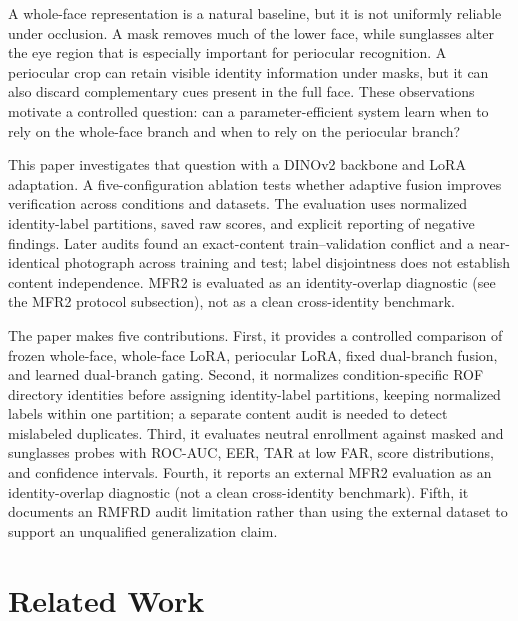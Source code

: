 \documentclass[10pt,journal,compsoc]{IEEEtran}
\begin{document}
A whole-face representation is a natural baseline, but it is not uniformly reliable under occlusion. A mask removes much of the lower face, while sunglasses alter the eye region that is especially important for periocular recognition. A periocular crop can retain visible identity information under masks, but it can also discard complementary cues present in the full face. These observations motivate a controlled question: can a parameter-efficient system learn when to rely on the whole-face branch and when to rely on the periocular branch?

This paper investigates that question with a DINOv2 backbone and LoRA adaptation. A five-configuration ablation tests whether adaptive fusion improves verification across conditions and datasets. The evaluation uses normalized identity-label partitions, saved raw scores, and explicit reporting of negative findings. Later audits found an exact-content train--validation conflict and a near-identical photograph across training and test; label disjointness does not establish content independence. MFR2 is evaluated as an identity-overlap diagnostic (see the MFR2 protocol subsection), not as a clean cross-identity benchmark.

The paper makes five contributions. First, it provides a controlled comparison of frozen whole-face, whole-face LoRA, periocular LoRA, fixed dual-branch fusion, and learned dual-branch gating. Second, it normalizes condition-specific ROF directory identities before assigning identity-label partitions, keeping normalized labels within one partition; a separate content audit is needed to detect mislabeled duplicates. Third, it evaluates neutral enrollment against masked and sunglasses probes with ROC-AUC, EER, TAR at low FAR, score distributions, and confidence intervals. Fourth, it reports an external MFR2 evaluation as an identity-overlap diagnostic (not a clean cross-identity benchmark). Fifth, it documents an RMFRD audit limitation rather than using the external dataset to support an unqualified generalization claim.

\section{Related Work}
\label{sec:related}
\end{document}

